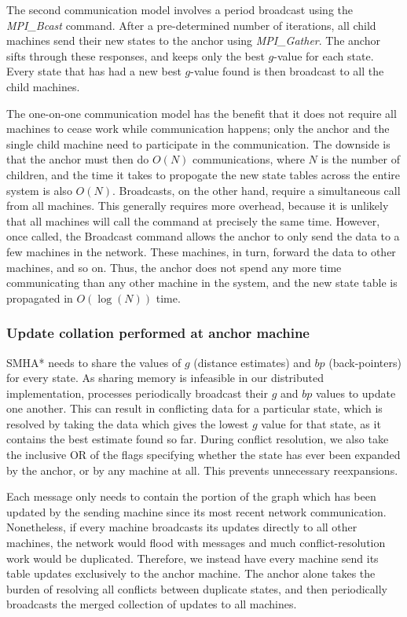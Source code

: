 \documentclass[11pt]{article}
\begin{document}
{The second communication model involves a period broadcast using the \emph{MPI\_Bcast} command. After a pre-determined number of iterations, all child machines send their new states to the anchor using \emph{MPI\_Gather}. The anchor sifts through these responses, and keeps only the best $g$-value for each state. Every state that has had a new best $g$-value found is then broadcast to all the child machines.

The one-on-one communication model has the benefit that it does not require all machines to cease work while communication happens; only the anchor and the single child machine need to participate in the communication. The downside is that the anchor must then do $O(N)$ communications, where $N$ is the number of children, and the time it takes to propogate the new state tables across the entire system is also $O(N)$. Broadcasts, on the other hand, require a simultaneous call from all machines. This generally requires more overhead, because it is unlikely that all machines will call the command at precisely the same time. However, once called, the Broadcast command allows the anchor to only send the data to a few machines in the network. These machines, in turn, forward the data to other machines, and so on. Thus, the anchor does not spend any more time communicating than any other machine in the system, and the new state table is propagated in $O(\log(N))$ time.

\subsubsection*{Update collation performed at anchor machine}

SMHA* needs to share the values of $g$ (distance estimates) and $bp$ (back-pointers) for every state. As sharing memory is infeasible in our distributed implementation, processes periodically broadcast their $g$ and $bp$ values to update one another. This can result in conflicting data for a particular state, which is resolved by taking the data which gives the lowest $g$ value for that state, as it contains the best estimate found so far. During conflict resolution, we also take the inclusive OR of the flags specifying whether the state has ever been expanded by the anchor, or by any machine at all. This prevents unnecessary reexpansions.

Each message only needs to contain the portion of the graph which has been updated by the sending machine since its most recent network communication. Nonetheless, if every machine broadcasts its updates directly to all other machines, the network would flood with messages and much conflict-resolution work would be duplicated. Therefore, we instead have every machine send its table updates exclusively to the anchor machine. The anchor alone takes the burden of resolving all conflicts between duplicate states, and then periodically broadcasts the merged collection of updates to all machines.

}
\end{document}
